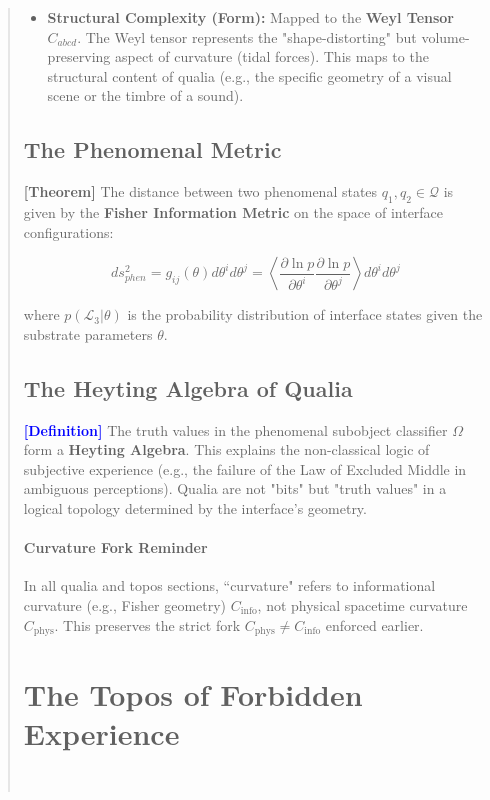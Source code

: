 \documentclass[11pt,titlepage]{article}
\newcommand{\interface}{\mathcal{L}_3}
\newcommand{\classifier}{\Omega}
\newcommand{\tagdef}{\textcolor{blue}{\textbf{[Definition]}} }
\newcommand{\tagtheo}{\textcolor{green!60!black}{\textbf{[Theorem]}} }
\begin{document}
\begin{abstract}
\begin{itemize}
\begin{itemize}
\item \textbf{Expansion ($R_{ab} v^a v^b < 0$):} Corresponds to \textbf{Positive Valence} (Pleasure), representing an expansion of the available state space.
    \end{itemize}
    
    
\item \textbf{Structural Complexity (Form):} Mapped to the \textbf{Weyl Tensor} $C_{abcd}$. The Weyl tensor represents the "shape-distorting" but volume-preserving aspect of curvature (tidal forces). This maps to the structural content of qualia (e.g., the specific geometry of a visual scene or the timbre of a sound).
\end{itemize}

\subsection{The Phenomenal Metric}
\tagtheo The distance between two phenomenal states $q_1, q_2 \in \mathcal{Q}$ is given by the \textbf{Fisher Information Metric} on the space of interface configurations:

\begin{equation}
ds^2_{phen} = g_{ij}(\theta) d\theta^i d\theta^j = \left\langle \frac{\partial \ln p}{\partial \theta^i} \frac{\partial \ln p}{\partial \theta^j} \right\rangle d\theta^i d\theta^j
\end{equation}

where $p(\interface | \theta)$ is the probability distribution of interface states given the substrate parameters $\theta$.

\subsection{The Heyting Algebra of Qualia}
\tagdef The truth values in the phenomenal subobject classifier $\classifier$ form a \textbf{Heyting Algebra}. This explains the non-classical logic of subjective experience (e.g., the failure of the Law of Excluded Middle in ambiguous perceptions). Qualia are not "bits" but "truth values" in a logical topology determined by the interface's geometry.


\paragraph{Curvature Fork Reminder} In all qualia and topos sections, ``curvature" refers to informational curvature (e.g., Fisher geometry) $C_{\mathrm{info}}$, not physical spacetime curvature $C_{\mathrm{phys}}$. This preserves the strict fork $C_{\mathrm{phys}} \neq C_{\mathrm{info}}$ enforced earlier.\n\section{The Topos of Forbidden Experience}\\%



\end{abstract}
\end{document}
